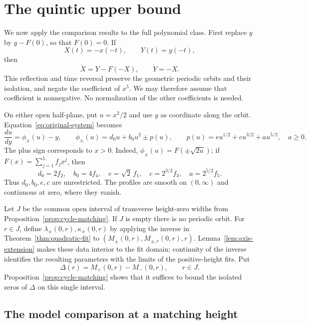 \section{The quintic upper bound}\label{sec:application}

We now apply the comparison results to the full polynomial class.
First replace $y$ by $y-F(0)$, so that $F(0)=0$. If
\[
 X(t)=-x(-t),\qquad Y(t)=y(-t),
\]
then
\[
 \dot X=Y-F(-X),\qquad \dot Y=-X.
\]
This reflection and time reversal preserve the geometric periodic
orbits and their isolation, and negate the coefficient of $x^5$.
We may therefore assume that coefficient is nonnegative. No
normalization of the other coefficients is needed.

On either open half-plane, put $u=x^2/2$ and use $y$ as coordinate
along the orbit. Equation~\eqref{eq:original-system} becomes
\begin{equation}\label{eq:quintic-profiles}
 \frac{du}{dy}=\phi_\pm(u)-y,\qquad
 \phi_\pm(u)=d_0u+b_0u^2\pm p(u),\qquad
 p(u)=e u^{1/2}+c u^{3/2}+a u^{5/2},\quad a\ge0.
\end{equation}
The plus sign corresponds to $x>0$. Indeed,
$\phi_\pm(u)=F(\pm\sqrt{2u})$; if
$F(x)=\sum_{j=1}^5 f_jx^j$, then
\[
 d_0=2f_2,\quad b_0=4f_4,\quad
 e=\sqrt2\,f_1,\quad c=2^{3/2}f_3,\quad a=2^{5/2}f_5.
\]
Thus $d_0,b_0,e,c$ are unrestricted. The profiles are smooth on
$(0,\infty)$ and continuous at zero, where they vanish.

Let $J$ be the common open interval of transverse height-zero
widths from Proposition~\ref{prop:cycle-matching}. If $J$ is empty
there is no periodic orbit. For $r\in J$, define
$\lambda_\pm(0,r),\kappa_\pm(0,r)$ by applying the inverse in
Theorem~\ref{thm:quadratic-fit} to
$(M_\pm(0,r),M_{\pm,r}(0,r),r)$.
Lemma~\ref{lem:axis-extension} makes these data interior to the
fit domain; continuity of the inverse identifies the resulting
parameters with the limits of the positive-height fits. Put
\begin{equation}\label{eq:matching-difference}
 \Delta(r)=M_+(0,r)-M_-(0,r),\qquad r\in J.
\end{equation}
Proposition~\ref{prop:cycle-matching} shows that it suffices to
bound the isolated zeros of $\Delta$ on this single interval.

\subsection{The model comparison at a matching height}

